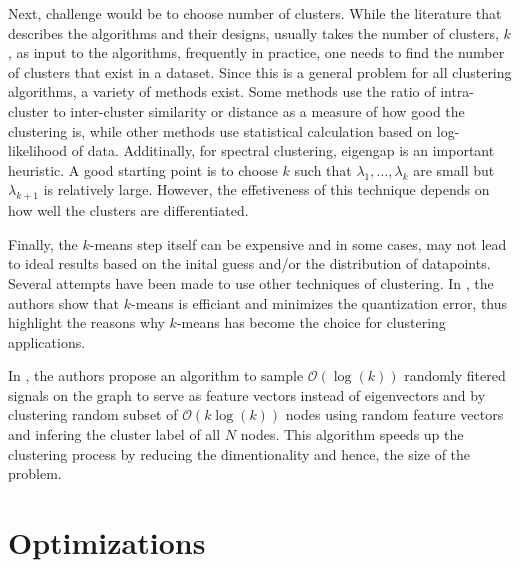 \documentclass[10pt,a4paper, nocenter]{report}
\begin{document}
    Next, challenge would be to choose number of clusters. While the literature that describes the algorithms and their designs, usually takes the number of clusters, $k$, as input to the algorithms, frequently in practice, one needs to find the number of clusters that exist in a dataset. Since this is a general problem for all clustering algorithms, a variety of methods exist. Some methods use the ratio of intra-cluster to inter-cluster similarity or distance as a measure of how good the clustering is, while other methods use statistical calculation based on log-likelihood of data. Additinally, for spectral clustering, eigengap is an important heuristic. A good starting point is to choose $k$ such that $\lambda_1,\dots,\lambda_k$ are small but $\lambda_{k+1}$ is relatively large. However, the effetiveness of this technique depends on how well the clusters are differentiated.

    Finally, the $k$-means step itself can be expensive and in some cases, may not lead to ideal results based on the inital guess and/or the distribution of datapoints. Several attempts have been made to use other techniques of clustering. In \cite{Bottou95convergenceproperties}, the authors show that $k$-means is efficiant and minimizes the quantization error, thus highlight the reasons why $k$-means has become the choice for clustering applications. 
    
    In \cite{tremblay-compressive-SC-16}, the authors propose an algorithm to sample $\mathcal{O}(\log(k))$ randomly fitered signals on the graph to serve as feature vectors instead of eigenvectors and by clustering random subset of $\mathcal{O}(k\log(k))$ nodes using random feature vectors and infering the cluster label of all $N$ nodes. This algorithm speeds up the clustering process by reducing the dimentionality and hence, the size of the problem.

    \section{Optimizations}

    \appendix
\end{document}

